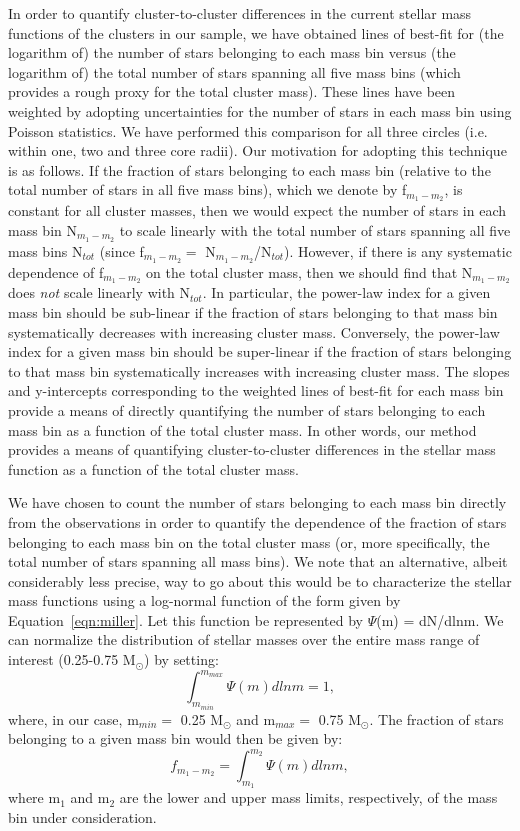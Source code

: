 In order to quantify cluster-to-cluster differences in the current
stellar mass functions of the clusters in our sample, we have obtained
lines of best-fit for 
(the logarithm of) the number of stars belonging to each mass bin
versus (the logarithm of) the total number of stars spanning all five
mass bins (which provides a rough proxy for the total cluster mass).
These lines have been weighted by adopting uncertainties for the
number of stars in each mass bin using Poisson statistics.  
We have performed this comparison for all three circles (i.e. within
one, two and three core radii).  Our motivation for adopting this
technique is as follows.  If the fraction of stars belonging to each
mass bin 
(relative to the total number of stars in all five mass bins), which
we denote by f$_{m_1-m_2}$, is
constant for all cluster masses, then we would expect the number of
stars in 
each mass bin N$_{m_1-m_2}$ to scale linearly with the total number of stars
spanning all five mass bins N$_{tot}$ (since f$_{m_1-m_2} =$
N$_{m_1-m_2}$/N$_{tot}$).  However, if there is any systematic
dependence of f$_{m_1-m_2}$ on the
total cluster mass, then we should find that N$_{m_1-m_2}$ does
\textit{not} scale linearly with N$_{tot}$.  In particular, the
power-law index for a given mass bin should be sub-linear if the
fraction of stars belonging to that mass bin systematically decreases
with increasing cluster mass.  Conversely, the
power-law index for a given mass bin should be super-linear if the
fraction of stars belonging to that mass bin systematically increases
with increasing cluster mass.  The slopes and y-intercepts
corresponding to the weighted lines of best-fit for each mass bin
provide a means of directly quantifying the number of stars belonging
to each mass bin as a function of the total cluster mass.  In other
words, our method provides a means of quantifying cluster-to-cluster
differences in the stellar mass function as a function of the total
cluster mass.

We have chosen to count the number of stars belonging to each mass bin
directly from the observations in order to quantify the dependence of
the fraction of stars belonging to each mass bin on the total cluster
mass (or, more specifically, the total number of stars spanning all
mass bins).  We note that an alternative, albeit considerably less
precise, 
way to go about this would be to characterize the stellar mass
functions using a log-normal function of the form given by
Equation~\ref{eqn:miller}.  Let this function be represented by
$\Psi$(m) = dN/dlnm.  We can normalize the distribution of stellar
masses over the entire mass range of interest (0.25-0.75 M$_{\odot}$)
by setting: 
\begin{equation}
\label{eqn:psi_norm}
\int_{m_{min}}^{m_{max}} \Psi(m) dlnm = 1,
\end{equation}
where, in our case, m$_{min} =$ 0.25 M$_{\odot}$ and m$_{max} =$ 0.75
M$_{\odot}$.  The fraction of stars belonging to a given mass bin
would then be given by:
\begin{equation}
\label{eqn:psi}
f_{m_1-m_2} = \int_{m_1}^{m_2} \Psi(m) dlnm,
\end{equation}
where m$_1$ and m$_2$ are the lower and upper mass limits,
respectively, of the mass bin under consideration.  


